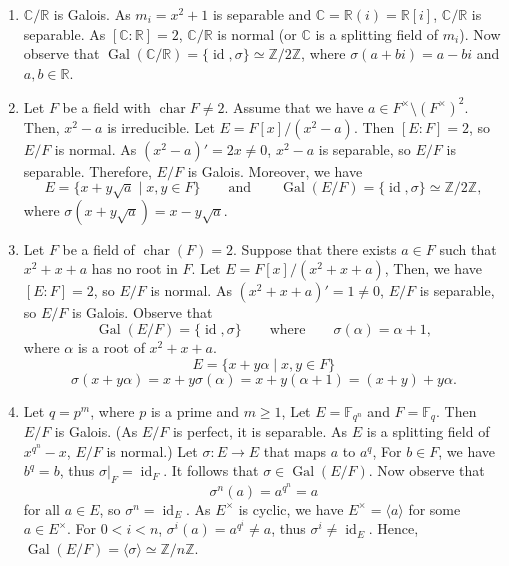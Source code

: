 \documentclass[twoside]{article}
\DeclareMathOperator\Char{char}
\DeclareMathOperator\Gal{Gal}
\DeclareMathOperator\id{id}
\newcommand\Z{\mathbb Z}
\newcommand\R{\mathbb R}
\newcommand\C{\mathbb C}
\newcommand\F{\mathbb F}
\theoremstyle{remark}
\begin{document}
\begin{examples}
  \begin{enumerate}[label=\arabic*.]
    \item \(\C/\R\) is Galois. As \(m_i = x^2+1\) is separable and \(\C = \R(i) = \R[i]\), \(\C/\R\) is separable. As \([\C:\R] = 2\), \(\C/\R\) is normal (or \(\C\) is a splitting field of \(m_i\)). Now observe that \(\Gal(\C/\R) = \{\id, \sigma\} \simeq \Z/2\Z\), where \(\sigma(a+bi) = a-bi\) and \(a,b \in \R\).
    
    \item Let \(F\) be a field with \(\Char F \neq 2\). Assume that we have \(a \in F^\times \setminus (F^\times)^2\). Then, \(x^2-a\) is irreducible. Let \(E = F[x] / (x^2-a)\). Then \([E:F] = 2\), so \(E/F\) is normal. As \((x^2-a)' = 2x \neq 0\), \(x^2-a\) is separable, so \(E/F\) is separable. Therefore, \(E/F\) is Galois. Moreover, we have
    \[ E = \{x+y \sqrt a \mid x,y \in F\} \qquad \text{and} \qquad \Gal(E/F) = \{\id,\sigma\} \simeq \Z/2\Z, \]
    where \(\sigma(x+y\sqrt a) = x-y\sqrt a\).
    
    \item Let \(F\) be a field of \(\Char(F) = 2\). Suppose that there exists \(a \in F\) such that \(x^2 + x + a\) has no root in \(F\). Let \(E = F[x] / (x^2+x+a)\), Then, we have \([E:F] = 2\), so \(E/F\) is normal. As \((x^2 + x + a)' = 1 \neq 0\), \(E/F\) is separable, so \(E/F\) is Galois. Observe that
    \[ \Gal(E/F) = \{\id, \sigma\} \qquad \text{where} \qquad \sigma(\alpha) = \alpha + 1, \]
    where \(\alpha\) is a root of \(x^2 + x + a\).
    \[ E = \{x + y\alpha \mid x,y \in F\} \]
    \[ \sigma(x + y\alpha) = x+y\sigma(\alpha) = x + y(\alpha+1) = (x+y) + y\alpha. \]
    
    \item Let \(q = p^m\), where \(p\) is a prime and \(m \geq 1\), Let \(E = \F_{q^n}\) and \(F = \F_q\). Then \(E/F\) is Galois. (As \(E/F\) is perfect, it is separable. As \(E\) is a splitting field of \(x^{q^n} - x\), \(E/F\) is normal.) Let \(\sigma\colon E \to E\) that maps \(a\) to \(a^q\), For \(b \in F\), we have \(b^q = b\), thus \(\sigma|_F = \id_F\). It follows that \(\sigma \in \Gal(E/F)\). Now observe that
    \[ \sigma^n(a) = a^{q^n} = a \]
    for all \(a \in E\), so \(\sigma^n = \id_E\). As \(E^\times\) is cyclic, we have \(E^\times = \langle a \rangle\) for some \(a \in E^\times\). For \(0 < i < n\), \(\sigma^i(a) = a^{q^i} \neq a\), thus \(\sigma^i \neq \id_E\). Hence, \(\Gal(E/F) = \langle \sigma \rangle \simeq \Z/n\Z\).
    

\end{enumerate}
\end{examples}
\end{document}
